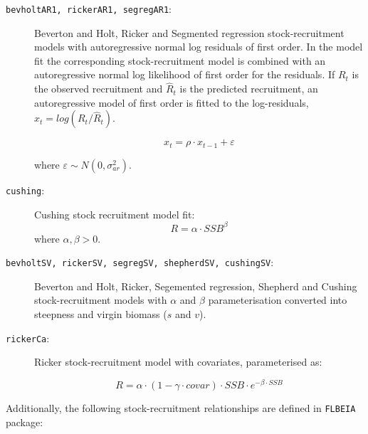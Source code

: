 \begin{description}
    \item[\texttt{bevholtAR1, rickerAR1, segregAR1}:] Beverton and Holt, Ricker and Segmented regression
      stock-recruitment models with autoregressive normal log
      residuals of first order. In the model fit the corresponding
      stock-recruitment model is combined with an autoregressive
      normal log likelihood of first order for the residuals. If
      $R_t$ is the observed recruitment and $\hat{R}_t$ is the predicted
      recruitment, an autoregressive model of first order is fitted
      to the log-residuals, $x_t = log(R_t/\hat{R}_t)$.

                           $$x_t = \rho\cdot x_{t-1} + \varepsilon$$

      where $\varepsilon \sim N(0,\sigma_{ar}^2)$.

    \item[\texttt{cushing}:] Cushing stock recruitment model fit:
              $$R = \alpha \cdot SSB ^ \beta$$
      where $\alpha, \beta > 0$.

    \item[\texttt{bevholtSV, rickerSV, segregSV, shepherdSV, cushingSV}:] Beverton and Holt, Ricker,
      Segemented regression, Shepherd and Cushing
      stock-recruitment models with $\alpha$ and $\beta$ parameterisation converted into
      steepness and virgin biomass ($s$ and $v$).

		\item[\texttt{rickerCa}:] Ricker stock-recruitment model with covariates, parameterised as:

          $$R = \alpha\cdot (1-\gamma \cdot covar) \cdot SSB \cdot e^{-\beta\cdot SSB}$$

  \end{description}
        
	Additionally, the following stock-recruitment relationships are defined in \texttt{FLBEIA} package:

